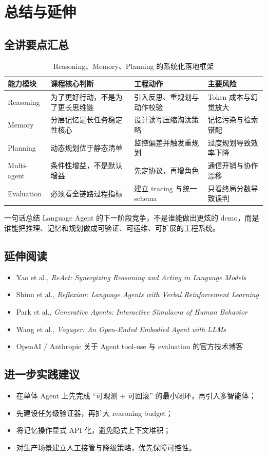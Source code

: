 \section{总结与延伸}

\subsection{全讲要点汇总}
\begin{table}[H]
\centering
\begin{tabular}{p{2.5cm}p{3.7cm}p{3.8cm}p{2.6cm}}
\toprule
\textbf{能力模块} & \textbf{课程核心判断} & \textbf{工程动作} & \textbf{主要风险} \\
\midrule
Reasoning & 为了更好行动，不是为了更长思维链 & 引入反思、重规划与动作校验 & Token 成本与幻觉放大 \\
Memory & 分层记忆是长任务稳定性核心 & 设计读写压缩淘汰策略 & 记忆污染与检索错配 \\
Planning & 动态规划优于静态清单 & 监控偏差并触发重规划 & 过度规划导致效率下降 \\
Multi-agent & 条件性增益，不是默认增益 & 先定协议，再增角色 & 通信开销与协作漂移 \\
Evaluation & 必须看全链路过程指标 & 建立 tracing 与统一 schema & 只看终局分数导致误判 \\
\bottomrule
\end{tabular}
\caption{Reasoning、Memory、Planning 的系统化落地框架}
\end{table}

\begin{importantbox}{一句话总结}
Language Agent 的下一阶段竞争，不是谁能做出更炫的 demo，而是谁能把推理、记忆和规划做成可验证、可运维、可扩展的工程系统。
\end{importantbox}

\subsection{延伸阅读}
\begin{itemize}
    \item Yao et al., \textit{ReAct: Synergizing Reasoning and Acting in Language Models}
    \item Shinn et al., \textit{Reflexion: Language Agents with Verbal Reinforcement Learning}
    \item Park et al., \textit{Generative Agents: Interactive Simulacra of Human Behavior}
    \item Wang et al., \textit{Voyager: An Open-Ended Embodied Agent with LLMs}
    \item OpenAI / Anthropic 关于 Agent tool-use 与 evaluation 的官方技术博客
\end{itemize}

\subsection{进一步实践建议}
\begin{itemize}
    \item 在单体 Agent 上先完成 ``可观测 + 可回滚'' 的最小闭环，再引入多智能体；
    \item 先建设任务级验证器，再扩大 reasoning budget；
    \item 将记忆操作显式 API 化，避免隐式上下文堆积；
    \item 对生产场景建立人工接管与降级策略，优先保障可控性。
\end{itemize}



